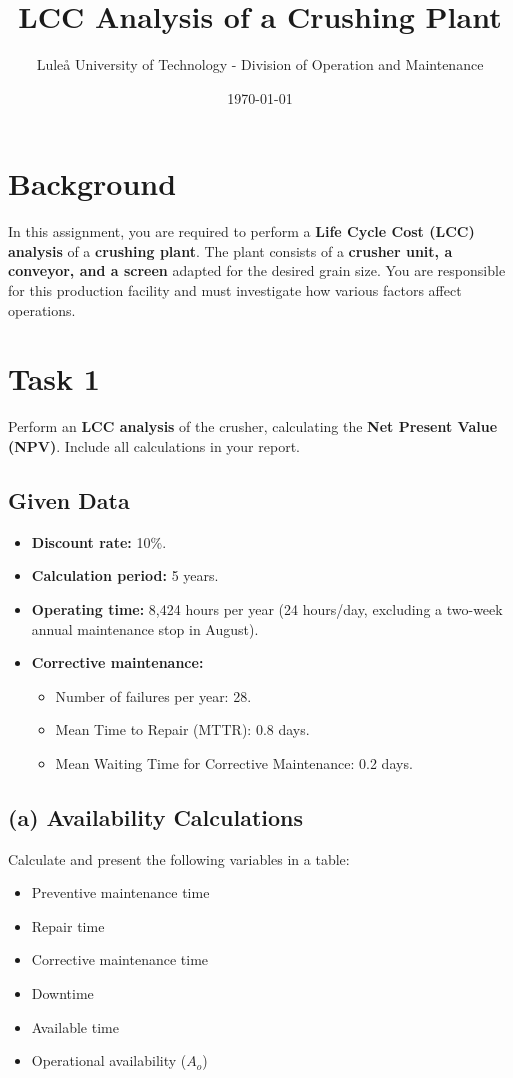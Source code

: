 \documentclass[a4paper,12pt]{article}
\title{LCC Analysis of a Crushing Plant}
\author{Lule\aa{} University of Technology - Division of Operation and Maintenance}
\date{\today}
\begin{document}
\maketitle

\section{Background}
In this assignment, you are required to perform a \textbf{Life Cycle Cost (LCC) analysis} of a \textbf{crushing plant}. The plant consists of a \textbf{crusher unit, a conveyor, and a screen} adapted for the desired grain size. You are responsible for this production facility and must investigate how various factors affect operations.

\section{Task 1}
Perform an \textbf{LCC analysis} of the crusher, calculating the \textbf{Net Present Value (NPV)}. Include all calculations in your report.

\subsection{Given Data}
\begin{itemize}
    \item \textbf{Discount rate:} 10\%.
    \item \textbf{Calculation period:} 5 years.
    \item \textbf{Operating time:} 8,424 hours per year (24 hours/day, excluding a two-week annual maintenance stop in August).
    \item \textbf{Corrective maintenance:}
    \begin{itemize}
        \item Number of failures per year: 28.
        \item Mean Time to Repair (MTTR): 0.8 days.
        \item Mean Waiting Time for Corrective Maintenance: 0.2 days.
    \end{itemize}
\end{itemize}

\subsection{(a) Availability Calculations}
Calculate and present the following variables in a table:
\begin{itemize}
    \item Preventive maintenance time
    \item Repair time
    \item Corrective maintenance time
    \item Downtime
    \item Available time
    \item Operational availability ($A_o$)
\end{itemize}
\end{document}
